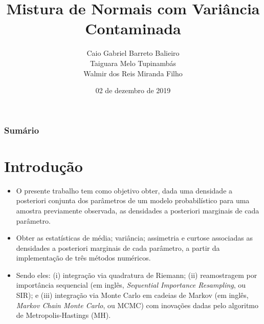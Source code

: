 \documentclass[9pt]{beamer}
\title[Mistura de Normais com Variância Contaminada]{Mistura de Normais com Variância Contaminada}
\author[Caio, Taiguara e Walmir]{\normalsize Caio Gabriel Barreto Balieiro\\ Taiguara Melo Tupinambás\\ Walmir dos Reis Miranda Filho}
\institute[]{\normalsize Programa de Pós-Graduação em Estatística\\ Departamento de Estatística - UFMG }
\date[06/12/2019]{02 de dezembro de 2019}
\begin{document}
\begin{frame}[plain]
\titlepage
\end{frame}

\begin{frame}[plain]
\frametitle{Sumário}
\tableofcontents
\end{frame}
\section{Introdução}
\begin{frame}
\begin{itemize}
\justifying
\item O presente trabalho tem como objetivo obter, dada uma densidade a posteriori conjunta dos
parâmetros de um modelo probabilístico para uma amostra previamente observada, as densidades a posteriori marginais de cada parâmetro.

\item Obter as estatísticas de média; variância; assimetria e curtose associadas as densidades a posteriori marginais de cada parâmetro, a partir da implementação de três métodos numéricos.

\item Sendo eles: (i) integração via quadratura de Riemann; (ii) reamostragem por importância sequencial (em inglês, \textit{Sequential Importance Resampling}, ou SIR); e (iii) integração via Monte Carlo em cadeias de Markov (em inglês, \textit{Markov Chain Monte Carlo}, ou MCMC) com inovações dadas pelo algoritmo de Metropolis-Hastings (MH).
\end{itemize}
\end{frame}
\end{document}
